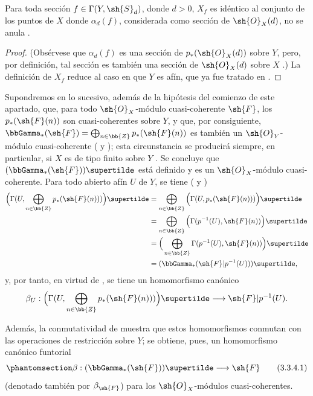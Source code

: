 \documentclass[oneside,10pt]{amsart}
\makeatletter
\newcommand{\ega@arrow}[2]{\mathchoice{#1}{#2}{#2}{#2}}
\renewcommand{\to}{\ega@arrow{\longrightarrow}{\rightarrow}}
\let\EGAOriginalLabel\label
\renewcommand{\label}[1]{\phantomsection\EGAOriginalLabel{#1}}
\makeatother
\begin{document}
\begin{proposition}[3.3.3]
\label{II.3.3.3}
Para toda sección $f\in\Gamma(Y,\sh{S}_d)$, donde $d>0$, $X_f$ es idéntico al conjunto de los puntos de $X$ donde $\alpha_d(f)$, considerada como sección de $\sh{O}_X(d)$, no se anula .
\end{proposition}

\begin{proof}
(Obsérvese que $\alpha_d(f)$ es una sección de $p_*(\sh{O}_X(d))$ sobre $Y$, pero, por definición, tal sección es también una sección de $\sh{O}_X(d)$ sobre $X$ .)
La definición de $X_f$  reduce al caso en que $Y$ es afín, que ya fue tratado en .
\end{proof}

\begin{env}[3.3.4]
\label{II.3.3.4}
Supondremos en lo sucesivo, además de la hipótesis del comienzo de este apartado, que, para todo $\sh{O}_X$-módulo cuasi-coherente $\sh{F}$, los $p_*(\sh{F}(n))$ son cuasi-coherentes sobre $Y$, y que, por consiguiente, $\bbGamma_*(\sh{F})=\bigoplus_{n\in\bb{Z}}p_*(\sh{F}(n))$ es también un $\sh{O}_Y$-módulo cuasi-coherente ( y ); esta circunstancia se producirá siempre, en particular, si $X$ es de tipo finito sobre $Y$ .
Se concluye que $(\bbGamma_*(\sh{F}))\supertilde$ está definido y es un $\sh{O}_X$-módulo cuasi-coherente.
Para todo abierto afín $U$ de $Y$, se tiene ( y )
\begin{align*}
  \Big(\Gamma(U,\bigoplus_{n\in\bb{Z}}p_*(\sh{F}(n)))\Big)\supertilde
  &=\bigoplus_{n\in\bb{Z}}\Big(\Gamma(U,p_*(\sh{F}(n)))\Big)\supertilde
\\&=\bigoplus_{n\in\bb{Z}}\Big(\Gamma(p^{-1}(U),\sh{F}(n))\Big)\supertilde
\\&=\Big(\bigoplus_{n\in\bb{Z}}\Gamma(p^{-1}(U),\sh{F}(n))\Big)\supertilde
\\&=(\bbGamma_*(\sh{F}|p^{-1}(U)))\supertilde,
\end{align*}
y, por tanto, en virtud de , se tiene un homomorfismo canónico
\[
  \beta_U:\Big(\Gamma(U,\bigoplus_{n\in\bb{Z}}p_*(\sh{F}(n)))\Big)\supertilde
  \to\sh{F}|p^{-1}(U).
\]

Además, la conmutatividad de  muestra que estos homomorfismos conmutan con las operaciones de restricción sobre $Y$; se obtiene, pues, un homomorfismo canónico funtorial
\[
\label{II.3.3.4.1}
  \beta:(\bbGamma_*(\sh{F}))\supertilde\to\sh{F}
\tag{3.3.4.1}
\]
(denotado también por $\beta_{\sh{F}}$) para los $\sh{O}_X$-módulos cuasi-coherentes.
\end{env}
\end{document}
